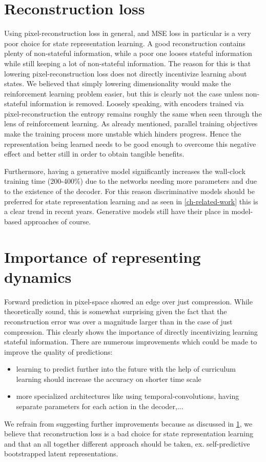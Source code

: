 \section{Reconstruction loss}
\label{sec-rec-loss-bad}
Using pixel-reconstruction loss in general, and MSE loss in particular is a very poor choice for state representation learning.
A good reconstruction contains plenty of non-stateful information, while a poor one
looses stateful information while still keeping a lot of non-stateful information.
The reason for this is that lowering pixel-reconstruction loss does not directly incentivize learning
about states.
We believed that simply lowering dimensionality would make the reinforcement learning problem easier,
but this is clearly not the case unless non-stateful information is removed.
Loosely speaking,
with encoders trained via pixel-reconstruction the entropy remains roughly the same
when seen through the lens of reinforcement learning.
As already mentioned, parallel training objectives make the training process more unstable
which hinders progress.
Hence the representation being learned needs to be good enough to overcome this negative effect
and better still in order to obtain tangible benefits.

Furthermore, having a generative model significantly increases the wall-clock training time (200-400\%)
due to the networks needing more parameters and due to the existence of the decoder.
For this reason discriminative models should be preferred for state representation learning
and as seen in \ref{ch-related-work} this is a clear trend in recent years.
Generative models still have their place in model-based approaches of course.



\section{Importance of representing dynamics}
Forward prediction in pixel-space showed an edge over just compression.
While theoretically sound, this is somewhat surprising given the fact that 
the reconstruction error was over a magnitude larger than in the case of just compression.
This clearly shows the importance of directly incentivizing learning stateful information.
There are numerous improvements which could be made to improve the quality of predictions:
\begin{itemize}
		\item learning to predict further into the future with the help of curriculum learning should
increase the accuracy on shorter time scale
\item more specialized architectures like using temporal-convolutions, having separate parameters 
		for each action in the decoder,...
\end{itemize}
We refrain from suggesting further improvements because as discussed in \ref{sec-rec-loss-bad},
we believe that reconstruction loss is a bad choice for state representation learning 
and that an all together different approach should be taken, ex. self-predictive bootstrapped latent
representations.


